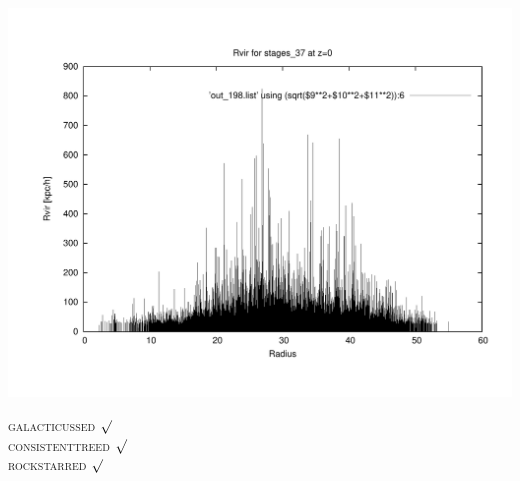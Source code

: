\includegraphics[scale=0.3]{stages_37/plot_rvir_z0.pdf}

\textsc{galacticussed} $\surd$ \\
\textsc{consistenttreed} $\surd$ \\ 
\textsc{rockstarred} $\surd$